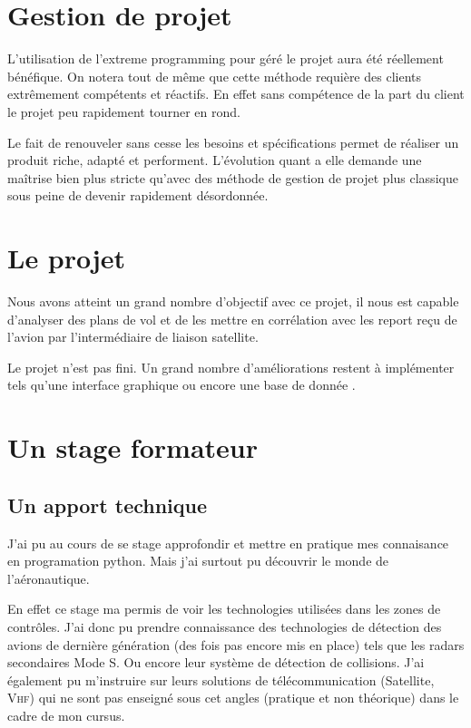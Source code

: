 
\section{Gestion de projet}
L'utilisation de l'extreme programming pour géré le projet aura été réellement bénéfique. On notera tout de même que cette méthode requière des clients extrêmement compétents et réactifs. En effet sans compétence de la part du client le projet peu rapidement tourner en rond.

Le fait de renouveler sans cesse les besoins et spécifications permet de réaliser un produit riche, adapté et performent. L'évolution quant a elle demande une maîtrise bien plus stricte qu'avec des méthode de gestion de projet plus classique sous peine de devenir rapidement désordonnée.

\section{Le projet}
Nous avons atteint un grand nombre d'objectif avec ce projet, il nous est capable d'analyser des plans de vol et de les mettre en corrélation avec les report reçu de l'avion par l'intermédiaire de liaison satellite.

Le projet n'est pas fini. Un grand nombre d'améliorations restent à implémenter tels qu'une interface graphique ou encore une base de donnée .

\section{Un stage formateur}
    \subsection{Un apport technique}
J'ai pu au cours de se stage approfondir et mettre en pratique mes connaisance en programation python. Mais j'ai surtout pu découvrir le monde de l'aéronautique. 

En effet ce stage ma permis de voir les technologies utilisées dans les zones de contrôles. J'ai donc pu prendre connaissance des technologies de détection des avions de dernière génération (des fois pas encore mis en place) tels que les radars secondaires Mode S. Ou encore leur système de détection de collisions. J'ai également pu m'instruire sur leurs solutions de télécommunication (Satellite, \textsc{Vhf}) qui ne sont pas enseigné sous cet angles (pratique et non théorique) dans le cadre de mon cursus.

